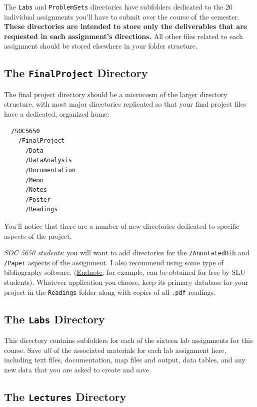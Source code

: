 \documentclass[]{book}
\theoremstyle{definition}
\theoremstyle{definition}
\theoremstyle{definition}
\theoremstyle{remark}
\begin{document}
The \texttt{Labs} and \texttt{ProblemSets} directories have subfolders
dedicated to the 26 individual assignments you'll have to submit over
the course of the semester. \textbf{These directories are intended to
store only the deliverables that are requested in each assignment's
directions.} All other files related to each assignment should be stored
elsewhere in your folder structure.

\subsection{\texorpdfstring{The \texttt{FinalProject}
Directory}{The FinalProject Directory}}\label{the-finalproject-directory}

The final project directory should be a microcosm of the larger
directory structure, with most major directories replicated so that your
final project files have a dedicated, organized home:

\begin{verbatim}
  /SOC5650
    /FinalProject
      /Data
      /DataAnalysis
      /Documentation
      /Memo
      /Notes
      /Poster
      /Readings
\end{verbatim}

You'll notice that there are a number of new directories dedicated to
specific aspects of the project.

\emph{SOC 5650 students}: you will want to add directories for the
\texttt{/AnnotatedBib} and \texttt{/Paper} aspects of the assignment. I
also recommend using some type of bibliography software.
(\href{http://endnote.com}{Endnote}, for example, can be obtained for
free by SLU students). Whatever application you choose, keep its primary
database for your project in the \texttt{Readings} folder along with
copies of all \texttt{.pdf} readings.

\subsection{\texorpdfstring{The \texttt{Labs}
Directory}{The Labs Directory}}\label{the-labs-directory}

This directory contains subfolders for each of the sixteen lab
assignments for this course. Save \emph{all} of the associated materials
for each lab assignment here, including text files, documentation, map
files and output, data tables, and any new data that you are asked to
create and save.

\subsection{\texorpdfstring{The \texttt{Lectures}
Directory}{The Lectures Directory}}\label{the-lectures-directory}
\end{document}
